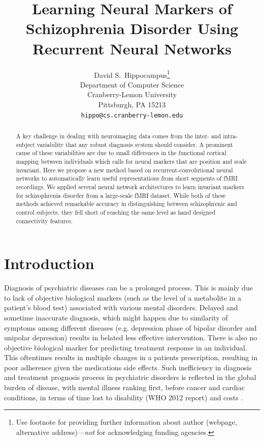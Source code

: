 \documentclass{article}
\title{Learning Neural Markers of Schizophrenia Disorder Using Recurrent Neural Networks}
\author{
  David S.~Hippocampus\thanks{Use footnote for providing further
    information about author (webpage, alternative
    address)---\emph{not} for acknowledging funding agencies.} \\
  Department of Computer Science\\
  Cranberry-Lemon University\\
  Pittsburgh, PA 15213 \\
  \texttt{hippo@cs.cranberry-lemon.edu} \\
}
\begin{document}

\maketitle

\begin{abstract}

A key challenge in dealing with neuroimaging data comes from the inter- and intra-subject variability that any robust diagnosis system should consider. A prominent cause of these variabilities are due to small differences in the functional cortical mapping between individuals which calls for neural markers that are position and scale invariant. Here we propose a new method based on recurrent-convolutional neural networks to automatically learn useful representations from short segments of fMRI recordings. We applied several neural network architectures to learn invariant markers for schizophrenia disorder from a large-scale fMRI dataset. While both of these methods achieved remarkable accuracy in distinguishing between schizophrenic and control subjects, they fell short of reaching the same level as hand designed connectivity features.

\end{abstract}

\section{Introduction}

Diagnosis of psychiatric diseases can be a prolonged process. This is mainly due to lack of objective biological markers (such as the level of a metabolite in a patient's blood test) associated with various mental disorders. Delayed and sometime inaccurate diagnosis, which might happen due to similarity of symptoms among different diseases (e.g. depression phase of bipolar disorder and unipolar depression) results in belated less effective intervention. There is also no objective biological marker for predicting treatment response in an individual. This oftentimes results in multiple changes in a patients prescription, resulting in poor adherence given the medications side effects. Such inefficiency in diagnosis and treatment prognosis process in psychiatric disorders is reflected in the global burden of disease, with mental illness ranking first, before cancer and cardiac conditions, in terms of time lost to disability (WHO 2012 report) and costs \citep{Roehrig2016}.
\end{document}
